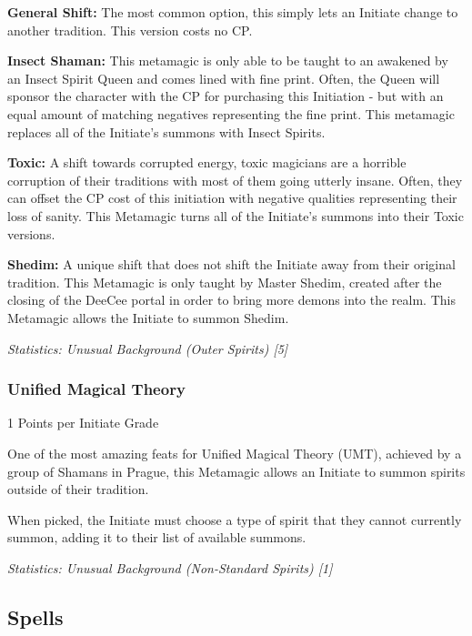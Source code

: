 \begin{multicols}{3}
	\textbf{General Shift: } The most common option, this simply lets an Initiate change to another tradition. This version costs no CP.
	
	\textbf{Insect Shaman:}	This metamagic is only able to be taught to an awakened by an Insect Spirit Queen and comes lined with fine print. Often, the Queen will sponsor the character with the CP for purchasing this Initiation - but with an equal amount of matching negatives representing the fine print. This metamagic replaces all of the Initiate's summons with Insect Spirits.
	
	\textbf{Toxic:} A shift towards corrupted energy, toxic magicians are a horrible corruption of their traditions with most of them going utterly insane. Often, they can offset the CP cost of this initiation with negative qualities representing their loss of sanity. This Metamagic turns all of the Initiate's summons into their Toxic versions.
	
	\textbf{Shedim: } A unique shift that does not shift the Initiate away from their original tradition. This Metamagic is only taught by Master Shedim, created after the closing of the DeeCee portal in order to bring more demons into the realm. This Metamagic allows the Initiate to summon Shedim.
	
	\textcolor{OliveGreen}{\textit{Statistics: Unusual Background (Outer Spirits) [5] }}
	
	\subsubsection{Unified Magical Theory}
	\begin{flushright}
		1 Points per Initiate Grade
	\end{flushright}
	
	One of the most amazing feats for Unified Magical Theory (UMT), achieved by a group of Shamans in Prague, this Metamagic allows an Initiate to summon spirits outside of their tradition.
	
	When picked, the Initiate must choose a type of spirit that they cannot currently summon, adding it to their list of available summons.
	
	\textcolor{OliveGreen}{\textit{Statistics: Unusual Background (Non-Standard Spirits) [1] }}
	
	\subsection{Spells}
	

\end{multicols}
